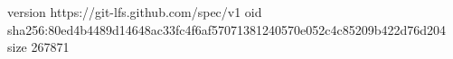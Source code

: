 version https://git-lfs.github.com/spec/v1
oid sha256:80ed4b4489d14648ac33fc4f6af57071381240570e052c4c85209b422d76d204
size 267871
